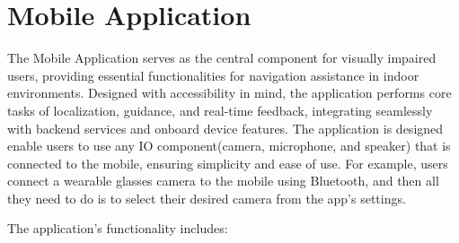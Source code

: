 \section{Mobile Application}
\label{Mobile Application Methodology Section}

The Mobile Application serves as the central component for visually impaired users, providing essential functionalities for navigation assistance in indoor environments. Designed with accessibility in mind, the application performs core tasks of localization, guidance, and real-time feedback, integrating seamlessly with backend services and onboard device features. The application is designed enable users to use any IO component(camera, microphone, and speaker) that is connected to the mobile, ensuring simplicity and ease of use. For example, users connect a wearable glasses camera to the mobile using Bluetooth, and then all they need to do is to select their desired camera from the app's settings.

The application’s functionality includes:

